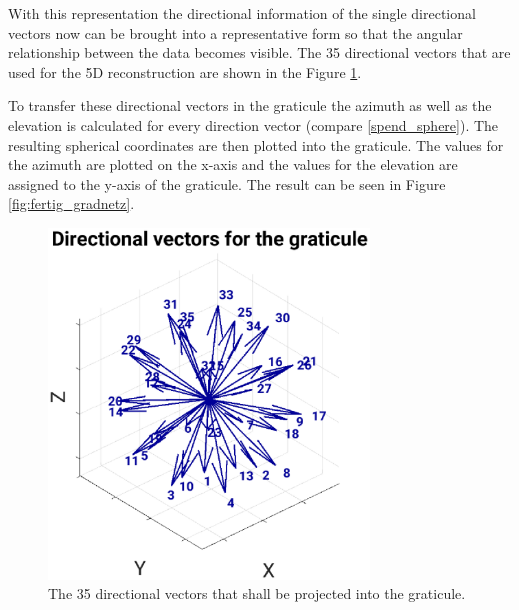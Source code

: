 With this representation the directional information of the single directional vectors now can be brought into a representative form so that the angular relationship between the data becomes visible. The 35 directional vectors that are used for the 5D reconstruction are shown in the Figure \ref{fig:gadnetz_directional_vectors}.

\medskip

To transfer these directional vectors in the graticule the azimuth as well as the elevation is calculated for every direction vector (compare \ref{spend_sphere}). The resulting spherical coordinates are then plotted into the graticule. The values for the azimuth are plotted on the x-axis and the values for the elevation are assigned to the y-axis of the graticule. The result can be seen in Figure \ref{fig:fertig_gradnetz}.
\begin{figure}[H]
    \centering
    \includegraphics[width=0.76\textwidth]{Graphics/Results/gradnetz/directional_vectors_for_gradnetz.eps}
    \caption{The 35 directional vectors that shall be projected into the graticule. }
    \label{fig:gadnetz_directional_vectors}
\end{figure}



